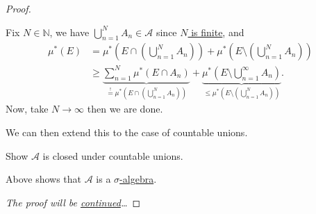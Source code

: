 \begin{proof}
\begin{enumerate}[(1)]
\begin{itemize}
\begin{explanation}
				            Fix \(N\in\mathbb{N} \), we have \(\bigcup\limits_{n=1}^{N} A_{n}\in \mathcal{A} \) since \hyperref[pf:Caratheodory-extension-Thm-1-finite-unions]{\(N\) is finite}, and
				            \[
					            \begin{split}
						            \mu^{\ast} (E) &= \mu^{\ast} \left(E\cap \left(\bigcup\limits_{n=1}^{N} A_{n}\right)\right) + \mu^{\ast} \left(E\setminus \left(\bigcup\limits_{n=1}^{N} A_{n}\right)\right)\\
						            &\geq \underbrace{\sum\limits_{n=1}^{N} \mu^{\ast} (E\cap A_{n})}_{ \overset{\hyperref[lma:disjoint-C-measurable-finite-additive]{!}}{=} \mu^{\ast} \left(E\cap \left(\bigcup\limits_{n=1}^{N} A_{n}\right)\right)} + \underbrace{\mu^{\ast} \left(E\setminus \bigcup\limits_{n=1}^{\infty} A_{n}\right)}_{\leq \mu^{\ast} \left(E\setminus \left(\bigcup\limits_{n=1}^{N} A_{n}\right)\right)}.
					            \end{split}
				            \]
				            Now, take \(N\to \infty \) then we are done.
			            \end{explanation}
			            We can then extend this to the case of countable unions.
			            \begin{exercise}
				            Show \(\mathcal{A} \) is closed under countable unions.
			            \end{exercise}
			            \begin{answer}
			            \end{answer}
		      \end{itemize}
		      Above shows that \(\mathcal{A} \) is a \hyperref[def:sigma-algebra]{\(\sigma\)-algebra}.
	\end{enumerate}
	\emph{The proof will be \hyperref[pf:Caratheodory-extension-Thm-cont]{continued}\ldots}
\end{proof}